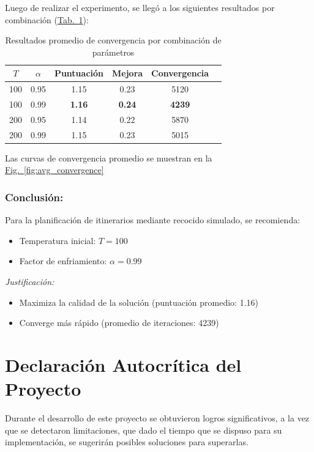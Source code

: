 \documentclass[10pt]{llncs}
\newcommand{\figref}[1]{\hyperref[#1]{Fig.~\ref*{#1}}}
\newcommand{\tabref}[1]{\hyperref[#1]{Tab.~\ref*{#1}}}
\begin{document}
Luego de realizar el experimento, se llegó a los siguientes resultados por combinación
(\tabref{tab:resultados-finales}):

\begin{table}[h]
\centering
\caption{Resultados promedio de convergencia por combinación de parámetros}
\label{tab:resultados-finales}
\begin{tabular}{cccccc}
\toprule
$T$ & $\alpha$ & Puntuación & Mejora & Convergencia \\
\midrule
100 & 0.95 & 1.15 & 0.23 & 5120 \\
100 & 0.99 & \textbf{1.16} & \textbf{0.24} & \textbf{4239} \\
200 & 0.95 & 1.14 & 0.22 & 5870 \\
200 & 0.99 & 1.15 & 0.23 & 5015 \\
\bottomrule
\end{tabular}
\end{table}

\begin{remark}
Las curvas de convergencia promedio se muestran en la {\figref{fig:avg_convergence}}
\end{remark}

\subsubsection{Conclusión:}
Para la planificación de itinerarios mediante recocido simulado, se recomienda:


\begin{itemize}
    \item Temperatura inicial: $T = 100$
    \item Factor de enfriamiento: $\alpha = 0.99$
\end{itemize}

\textit{Justificación:}
\begin{itemize}
    \item Maximiza la calidad de la solución (puntuación promedio: 1.16)
    \item Converge más rápido  (promedio de iteraciones: 4239)
\end{itemize}


\section{Declaración Autocrítica del Proyecto}\label{sec:autocritica}

Durante el desarrollo de este proyecto se obtuvieron logros significativos, a la vez que se detectaron limitaciones, que 
dado el tiempo que se dispuso para su implementación, se sugerirán posibles soluciones para superarlas.
\end{document}
